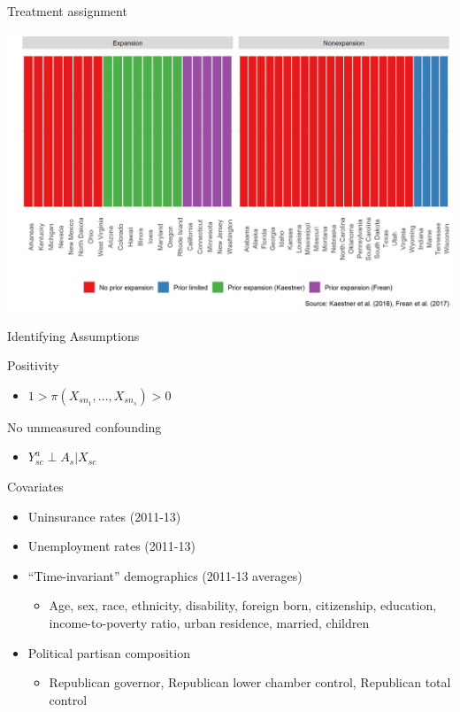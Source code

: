 \documentclass[hyperref={pdfpagelabels=false}]{beamer}
\begin{document}
\begin{frame}{Treatment assignment}
    \begin{center}
	\includegraphics[scale=0.5]{01_Plots/expansion-heterogeneity-classification.png}  
    \end{center}
\end{frame}

\begin{frame}{Identifying Assumptions}
    \item Positivity \bigskip
    \begin{itemize}
        \item $1 > \pi(X_{sn_1}, ..., X_{sn_s}) > 0$ \bigskip
    \end{itemize}
    \item No unmeasured confounding \bigskip
    \begin{itemize}
        \item $Y^a_{sc} \perp A_s | X_{sc}$ \bigskip 
    \end{itemize}
\end{frame}

\begin{frame}{Covariates}
\begin{itemize}
    \item Uninsurance rates (2011-13) \bigskip
    \item Unemployment rates (2011-13) \bigskip
    \item ``Time-invariant'' demographics (2011-13 averages) \bigskip
    \begin{itemize}
        \item Age, sex, race, ethnicity, disability, foreign born, citizenship, education, income-to-poverty ratio, urban residence, married, children \bigskip
    \end{itemize}
    \item Political partisan composition \bigskip
    \begin{itemize}
        \item Republican governor, Republican lower chamber control, Republican total control
    \end{itemize}
\end{itemize}
\end{frame}
\end{document}
